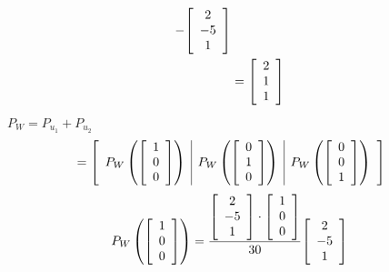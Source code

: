 \documentclass[11pt, a4paper, norsk]{NTNUoving}
\newenvironment{pkt}{\begin{punkt}}{\end{punkt}}
\newenvironment{matrise}[1][c]{
        \left[
            \begin{array}{#1}
    }
    {    
    \end{array}
    \right]           
}
\begin{document}
\begin{oppgave}
\begin{pkt}
\begin{align*}
            -\begin{matrise}
            2\\-5\\1
            \end{matrise}
            \\&=\begin{matrise}
            2\\1\\1
            \end{matrise}
        \end{align*}
    \end{pkt}
    \begin{pkt}
    $P_W=P_{u_1}+P_{u_2}$
        \begin{align*}
            [P_W]&=\begin{matrise}[c|c|c]
            P_W\left( \begin{matrise}
            1\\0\\0
            \end{matrise}\right) & P_W\left( \begin{matrise}
            0\\1\\0
            \end{matrise}\right) & P_W\left( \begin{matrise}
            0\\0\\1
            \end{matrise}\right)
        \end{matrise}
        \end{align*}    
        \begin{align*}
            P_W\left( \begin{matrise}
            1\\0\\0
            \end{matrise}\right) &=\frac{\begin{matrise}
            2\\-5\\1
            \end{matrise} \cdot \begin{matrise}
            1\\0\\0
            \end{matrise}}{30}\begin{matrise}
            2\\-5\\1

\end{matrise}
\end{align*}
\end{pkt}
\end{oppgave}
\end{document}

